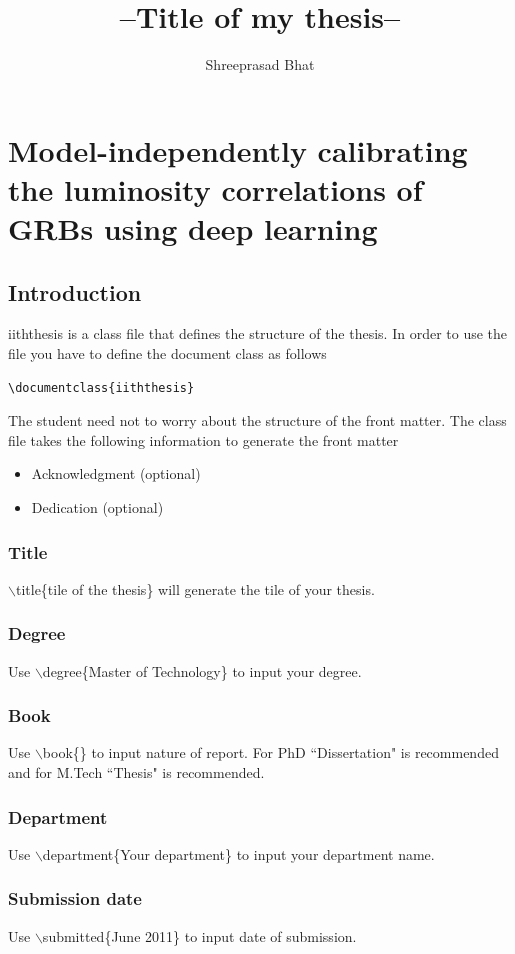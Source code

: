 \documentclass[a4paper,twoside]{iiththesis}
\title{--Title of my thesis--}
\author{Shreeprasad Bhat}
\begin{document}
\chapter{Model-independently calibrating the luminosity correlations of GRBs using deep learning}
\section{Introduction}
iiththesis is a class file that defines the structure of the thesis. In order to use the file you have to define the
document class as follows
\begin{verbatim}
\documentclass{iiththesis}
\end{verbatim}
The student need not to worry about the structure of the front matter. The class file takes the following information to generate the front matter
\begin{itemize}
\item Acknowledgment (optional)
\item Dedication (optional)

\end{itemize}
\subsection{Title}
$ \backslash $title\{tile of the thesis\} will generate the tile of your thesis.

\subsection{Degree}
Use $ \backslash $degree\{Master of Technology\} to input your degree.

\subsection{Book}
Use $ \backslash $book\{\} to input nature of report. For PhD ``Dissertation" is recommended and
for M.Tech ``Thesis" is recommended.

\subsection{Department}
Use $ \backslash $department\{Your department\} to input your department name.

\subsection{Submission date}
Use $ \backslash $submitted\{June 2011\} to input date of submission.
\end{document}
